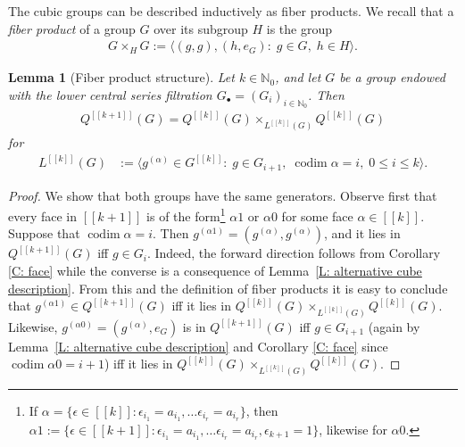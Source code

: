 \documentclass[11pt]{amsart}
\newtheorem{lemma}{Lemma}[section]
\theoremstyle{definition}
\newcommand{\N}{{\mathbb N}}
\newcommand{\eps}{\epsilon}
\newcommand{\cube}[1]{{[\![#1]\!]}}
\newcommand{\1}{{\mathbf{1}}}
\DeclareMathOperator{\codim}{codim}
\begin{document}
The cubic groups can be described inductively as fiber products. We recall that a \textit{fiber product} of a group $G$ over its subgroup $H$ is the group
\begin{align*}
    G\times_H G :=\langle(g,g), (h, e_G)\colon\; g\in G,\; h\in H\rangle.
\end{align*}
\begin{lemma}[Fiber product structure]\label{L: fiber products}
    Let $k\in\N_0$, and let $G$ be a group endowed with the lower central series filtration $G_\bullet = (G_i)_{i\in\N_0}$. Then
    \begin{align*}
        Q^\cube{k+1}(G) = Q^\cube{k}(G)\times_{L^\cube{k}(G)}Q^\cube{k}(G)
    \end{align*}
    for
    \begin{align*}
        L^\cube{k}(G) &:=\langle g^{(\alpha)}\in G^\cube{k}\colon\; g\in G_{i+1},\; \codim \alpha = i,\; 0\leq i\leq k\rangle.
    \end{align*}
\end{lemma}
\begin{proof}
    We show that both groups have the same generators. Observe first that every face in $\cube{k+1}$ is of the form\footnote{If $\alpha= \{\eps\in\cube{k}\colon \eps_{i_1} = a_{i_1}, \ldots \eps_{i_r}=a_{i_r}\}$, then $\alpha1:= \{\eps\in\cube{k+1}\colon \eps_{i_1} = a_{i_1}, \ldots \eps_{i_r}=a_{i_r}, \eps_{k+1} = 1\}$, likewise for $\alpha 0$.} $\alpha 1$ or $\alpha 0$ for some face $\alpha\in\cube{k}$. Suppose that $\codim \alpha = i$. Then $g^{(\alpha 1)} = (g^{(\alpha)}, g^{(\alpha)})$, and it lies in $Q^\cube{k+1}(G)$ iff $g\in G_{i}$. Indeed, {the forward direction follows from Corollary \ref{C: face} while the converse is a consequence of Lemma~\ref{L: alternative cube description}}. From this and the definition of fiber products it is easy to conclude that $g^{(\alpha 1)}\in Q^\cube{k+1}(G)$ iff it lies in $Q^\cube{k}(G)\times_{L^\cube{k}(G)}Q^\cube{k}(G)$. 
    Likewise, $g^{(\alpha 0)} = (g^{(\alpha)},e_G)$ is in $Q^\cube{k+1}(G)$ iff $g\in G_{i+1}$ (again by Lemma~\ref{L: alternative cube description} and Corollary \ref{C: face} since $\codim \alpha 0=i+1$) iff it lies in $Q^\cube{k}(G)\times_{L^\cube{k}(G)}Q^\cube{k}(G)$.
\end{proof}
 
\end{document}
